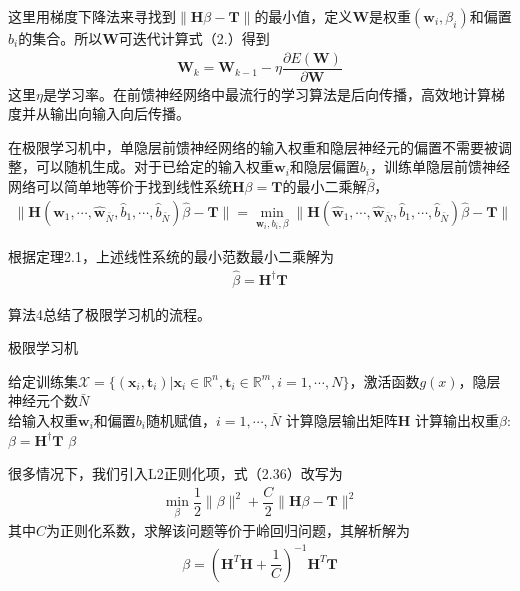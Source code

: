 \documentclass[supercite]{HustGraduPaper}
\begin{document}
\begin{sloppypar}
  这里用梯度下降法来寻找到$\lVert\mathbf{H}\beta-\mathbf{T}\rVert$的最小值，定义$\mathbf{W}$是权重$(\bm{w}_i,\beta_i)$和偏置$b_i$的集合。所以$\mathbf{W}$可迭代计算式（2.）得到\begin{gather}
   \mathbf{W}_k=\mathbf{W}_{k-1}-\eta\dfrac{\partial E(\mathbf{W})}{\partial \mathbf{W}}
  \end{gather}
  这里$\eta$是学习率。在前馈神经网络中最流行的学习算法是后向传播，高效地计算梯度并从输出向输入向后传播。

  在极限学习机中，单隐层前馈神经网络的输入权重和隐层神经元的偏置不需要被调整，可以随机生成。对于已给定的输入权重$\bm{w}_i$和隐层偏置$b_i$，训练单隐层前馈神经网络可以简单地等价于找到线性系统$\mathbf{H}\beta=\mathbf{T}$的最小二乘解$\hat{\beta}$，\begin{gather}
    \lVert\mathbf{H}(\hat{\bm{w}}_1,\cdots,\hat{\bm{w}}_{\bar{N}},\hat{b}_1,\cdots,\hat{b}_{\bar{N}})\hat{\beta}-\mathbf{T}\rVert=\min\limits_{\bm{w}_i,b_i,\beta}\lVert\mathbf{H}(\hat{\bm{w}}_1,\cdots,\hat{\bm{w}}_{\bar{N}},\hat{b}_1,\cdots,\hat{b}_{\bar{N}})\hat{\beta}-\mathbf{T}\rVert
  \end{gather}

  根据定理2.1，上述线性系统的最小范数最小二乘解为\begin{gather}
    \hat{\beta}=\mathbf{H}^{\dag}\mathbf{T}
  \end{gather}

  算法4总结了极限学习机的流程。\begin{algorithm}[H] 
    \caption{极限学习机} 
    \label{alg:Framwork} 
    \begin{algorithmic}[1] %
    \REQUIRE 给定训练集$\mathcal{X}=\{ (\bm{x}_i,\bm{t}_i)|\bm{x}_i\in\mathbb{R}^n,\bm{t}_i\in\mathbb{R}^m,i=1,\cdots,N \}$，激活函数$g(x)$，隐层神经元个数$\bar{N}$\\
    \STATE 给输入权重$\bm{w}_i$和偏置$b_i$随机赋值，$i=1,\cdots,\bar{N}$
    \STATE 计算隐层输出矩阵$\mathbf{H}$
    \STATE 计算输出权重$\beta$: $\beta=\mathbf{H}^{\dag}\mathbf{T}$
    \RETURN $\beta$
    \end{algorithmic}
  \end{algorithm}

  很多情况下，我们引入L2正则化项\cite{6035797}，式（2.36）改写为\begin{gather}
    \min\limits_{\beta}\dfrac{1}{2}\lVert\beta\rVert^2+\dfrac{C}{2}\lVert\mathbf{H}\beta-\mathbf{T}\rVert^2
  \end{gather}
  其中$C$为正则化系数，求解该问题等价于岭回归问题，其解析解为\begin{gather}
   \beta=\left( \mathbf{H}^T\mathbf{H}+\dfrac{1}{C} \right)^{-1}\mathbf{H}^T\mathbf{T}
  \end{gather}


\end{sloppypar}
\end{document}
